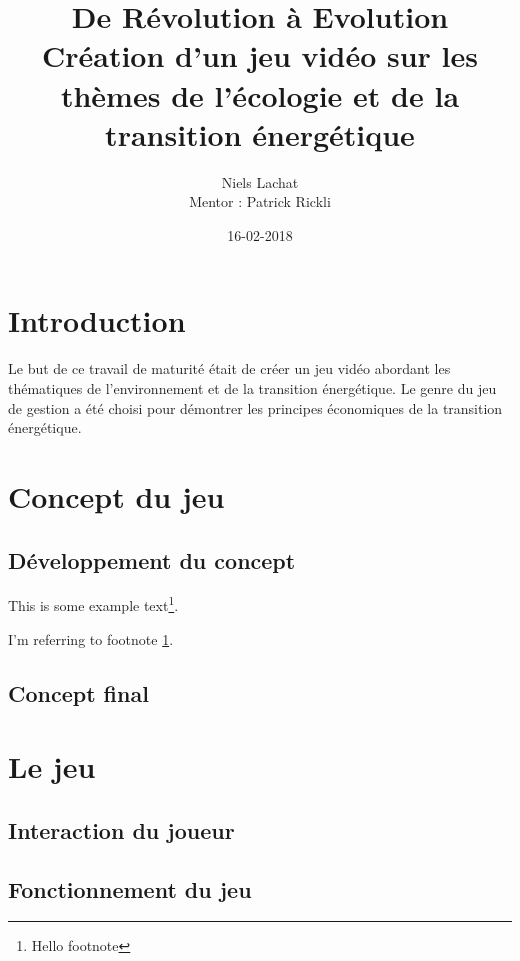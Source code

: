 \documentclass{article}
\title{De Révolution à Evolution \\ Création d'un jeu vidéo sur les thèmes de l'écologie et de la transition énergétique}
\date{16-02-2018}
\author{Niels Lachat \\ Mentor : Patrick Rickli}
\begin{document}
        \maketitle
        \newpage

        \tableofcontents
        \newpage

        \section{Introduction}
        Le but de ce travail de maturité était de créer un jeu vidéo abordant les thématiques de l'environnement et de la transition énergétique. Le genre du jeu de gestion a été choisi pour démontrer les principes économiques de la transition énergétique.

        \section{Concept du jeu}
        \subsection{Développement du concept}
        This is some example text\footnote{\label{myfootnote}Hello footnote}.

        I'm referring to footnote \ref{myfootnote}.

        \subsection{Concept final}

        \section{Le jeu}
        \subsection{Interaction du joueur}

        \subsection{Fonctionnement du jeu}
\end{document}
